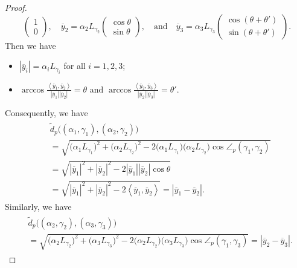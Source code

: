 \documentclass[draft]{amsart}
\numberwithin{equation}{section}
\def\R{\mathbb R}
\newcommand{\ip}[2]{\left\langle #1, #2 \right\rangle}
\providecommand{\abs}[1]{\left\lvert#1\right\rvert}
\theoremstyle{plain}
\theoremstyle{definition}
\theoremstyle{remark}
\begin{document}
\begin{proof}
\[\begin{pmatrix}
   1 \\
   0
  \end{pmatrix}, 
  \quad 
  \overline{y}_2 = 
  \alpha_2 L_{\gamma_2}
  \begin{pmatrix}
   \cos \theta  \\
   \sin \theta 
  \end{pmatrix}, 
  \quad \textrm{and} \quad 
  \overline{y}_3 = 
   \alpha_3 L_{\gamma_3}
   \begin{pmatrix}
   \cos (\theta + \theta') \\
   \sin (\theta + \theta')
  \end{pmatrix}. 
 \] 
 Then we have
 \begin{itemize}
  \item $\abs{\overline{y}_i} = \alpha_i L_{\gamma_i}$ 
 for all $i=1,2,3$; 
  \item $\arccos \frac{\ip{\overline{y}_1}{\overline{y}_2}}
 {\abs{\overline{y}_1}\abs{\overline{y}_2}} = \theta$ 
 and $\arccos \frac{\ip{\overline{y}_2}{\overline{y}_3}}
 {\abs{\overline{y}_2}\abs{\overline{y}_3}} = \theta'$. 
 \end{itemize}
 Consequently, we have 
 \begin{align}
  \begin{split}\label{eq:d_p-pm-a}
  &\tilde{d}_p\bigl((\alpha_1, \gamma_1), (\alpha_2, \gamma_2)\bigr) \\
  &= \sqrt{\bigl(\alpha_1 L_{\gamma_1}\bigr)^2 
 +\bigl(\alpha_2 L_{\gamma_2}\bigr)^2 
 -2\bigl(\alpha_1 L_{\gamma_1}\bigr)
 \bigl(\alpha_2 L_{\gamma_2}\bigr)\cos \angle_p(\gamma_1, \gamma_2)} \\
  &= \sqrt{\abs{\overline{y}_1}^2 + \abs{\overline{y}_2}^2 
 -2\abs{\overline{y}_1}\abs{\overline{y}_2}
 \cos \theta} \\
  &= \sqrt{\abs{\overline{y}_1}^2 + \abs{\overline{y}_2}^2 
 -2\ip{\overline{y}_1}{\overline{y}_2}} 
  =\abs{\overline{y}_1-\overline{y}_2}. 
  \end{split}
 \end{align}
 Similarly, we have 
 \begin{align}
  \begin{split}\label{eq:d_p-pm-b}
  &\tilde{d}_p\bigl((\alpha_2, \gamma_2), (\alpha_3, \gamma_3)\bigr) \\
  &= \sqrt{\bigl(\alpha_2 L_{\gamma_2}\bigr)^2 
    +\bigl(\alpha_3 L_{\gamma_3}\bigr)^2 
 -2\bigl(\alpha_2 L_{\gamma_2}\bigr)
 \bigl(\alpha_3 L_{\gamma_3}\bigr)\cos \angle_p(\gamma_1, \gamma_3)} 
  = \abs{\overline{y}_2-\overline{y}_3}.       
  \end{split}
 \end{align}


\end{proof}
\end{document}
